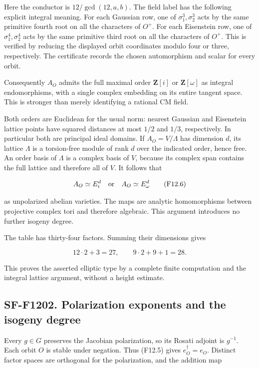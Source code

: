 Here the conductor is \(12/\gcd(12,a,b)\). The field label has the
following explicit integral meaning. For each Gaussian row, one of
\(\sigma_1^3,\sigma_2^3\) acts by the same primitive fourth root on all
the characters of \(O^+\). For each Eisenstein row, one of
\(\sigma_1^4,\sigma_2^4\) acts by the same primitive third root on all
the characters of \(O^+\). This is verified by reducing the displayed
orbit coordinates modulo four or three, respectively. The certificate
records the chosen automorphism and scalar for every orbit.

Consequently \(A_O\) admits the full maximal order \(\mathbf Z[i]\) or
\(\mathbf Z[\omega]\) as integral endomorphisms, with a single complex
embedding on its entire tangent space. This is stronger than merely
identifying a rational CM field.

Both orders are Euclidean for the usual norm: nearest Gaussian and
Eisenstein lattice points have squared distances at most \(1/2\) and
\(1/3\), respectively. In particular both are principal ideal domains.
If \(A_O=V/\Lambda\) has dimension \(d\), its lattice \(\Lambda\) is a
torsion-free module of rank \(d\) over the indicated order, hence free.
An order basis of \(\Lambda\) is a complex basis of \(V\), because its
complex span contains the full lattice and therefore all of \(V\). It
follows that

\[
 A_O\simeq E_i^d\quad\hbox{or}\quad A_O\simeq E_\omega^d
 \tag{F12.6}
\]

as unpolarized abelian varieties. The maps are analytic homomorphisms
between projective complex tori and therefore algebraic. This argument
introduces no further isogeny degree.

The table has thirty-four factors. Summing their dimensions gives

\[
 12\cdot2+3=27,\qquad
 9\cdot2+9+1=28.
\]

This proves the asserted elliptic type by a complete finite computation
and the integral lattice argument, without a height estimate.

\subsection{SF-F1202. Polarization exponents and the isogeny
degree}\label{SF-F1202}

Every \(g\in G\) preserves the Jacobian polarization, so its Rosati
adjoint is \(g^{-1}\). Each orbit \(O\) is stable under negation. Thus
(F12.5) gives \(e_O^\dagger=e_O\). Distinct factor spaces are orthogonal
for the polarization, and the addition map

